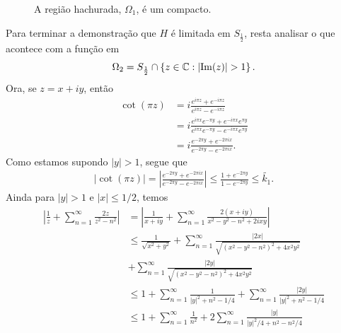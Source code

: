 \begin{exemplo}
\begin{figure}[H]
            \caption{%
                A região hachurada, $\Omega_1$, é um compacto.
            }
        \end{figure}
        Para terminar a demonstração que $H$ é limitada em $S_{\frac{1}{2}}$,
        resta analisar o que acontece com a função em
        \begin{equation*}
            \Omega_2 = S_{\frac{1}{2}} \cap \left\{ z\in\mathbb{C} : |\mathrm{Im}(z)| > 1 \right\}.
        \end{equation*}
        Ora, se $z = x+iy$, então
        \begin{align*}
            \cot(\pi z) &= 
            i\frac{ e^{i\pi z} + e^{-i\pi z} }{ e^{i\pi z} - e^{-i\pi z} } \\
            &= i\frac{ e^{i\pi x}e^{-\pi y} + e^{-i\pi x}e^{\pi y} }
            { e^{i\pi x}e^{-\pi y} - e^{-i\pi x}e^{\pi y} } \\
            &= i\frac{ e^{-2\pi y} + e^{-2\pi ix} }{ e^{-2\pi y} - e^{-2\pi ix} }.
        \end{align*}
        Como estamos supondo $|y|>1$, segue que
        \begin{align*}
            |\cot(\pi z)| = 
            \left| 
            \frac{ e^{-2\pi y} + e^{-2\pi ix} }{ e^{-2\pi y} - e^{-2\pi ix} } 
            \right|
            \leq \frac{ 1 + e^{-2\pi y} }{ 1 - e^{-2\pi y} }
            \leq \widetilde{k_1}.
        \end{align*}
        Ainda para $|y|>1$ e $|x|\leq 1/2$, temos
        \begin{align*}
            \left| 
            \frac{1}{z} + \sum_{n=1}^{\infty} \frac{2z}{z^2 - n^2} 
            \right|
            &= \left| 
            \frac{1}{x+iy} + \sum_{n=1}^{\infty} \frac{2(x+iy)}{x^2 - y^2 - n^2 +2ixy} 
            \right| \\
            &\leq \frac{1}{\sqrt{x^2 + y^2}} 
            + \sum_{n=1}^{\infty} \frac{|2x|}{\sqrt{(x^2 - y^2 - n^2)^2 + 4x^2y^2}} \\
            &+ \sum_{n=1}^{\infty} \frac{|2y|}{\sqrt{(x^2 - y^2 - n^2)^2 + 4x^2y^2}} \\
            &\leq 1 
            + \sum_{n=1}^{\infty} \frac{1}{|y|^2 + n^2 - 1/4}
            + \sum_{n=1}^{\infty} \frac{|2y|}{|y|^2 + n^2 - 1/4} \\
            &\leq 1 + \sum_{n=1}^{\infty} \frac{1}{n^2} 
            + 2\sum_{n=1}^{\infty} \frac{|y|}{|y|^2/4 + n^2 - n^2/4} \\

\end{align*}
\end{exemplo}
